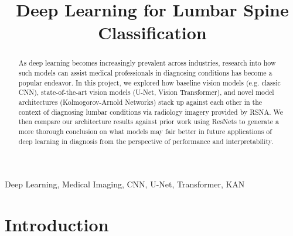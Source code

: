 \documentclass[conference]{IEEEtran}
\begin{document}
\title{Deep Learning for Lumbar Spine Classification}

\author{
\and
{}
\and
{}
}

\maketitle


\begin{abstract}
As deep learning becomes increasingly prevalent across industries, research into how such models can assist medical professionals in diagnosing conditions has become a popular endeavor. In this project, we explored how baseline vision models (e.g. classic CNN), state-of-the-art vision models (U-Net, Vision Transformer), and novel model architectures (Kolmogorov-Arnold Networks) stack up against each other in the context of diagnosing lumbar conditions via radiology imagery provided by RSNA. We then compare our architecture results against prior work using ResNets to generate a more thorough conclusion on what models may fair better in future applications of deep learning in diagnosis from the perspective of performance and interpretability.
\end{abstract}

\begin{IEEEkeywords}
Deep Learning, Medical Imaging, CNN, U-Net, Transformer, KAN
\end{IEEEkeywords}


\section{Introduction}
\end{document}
